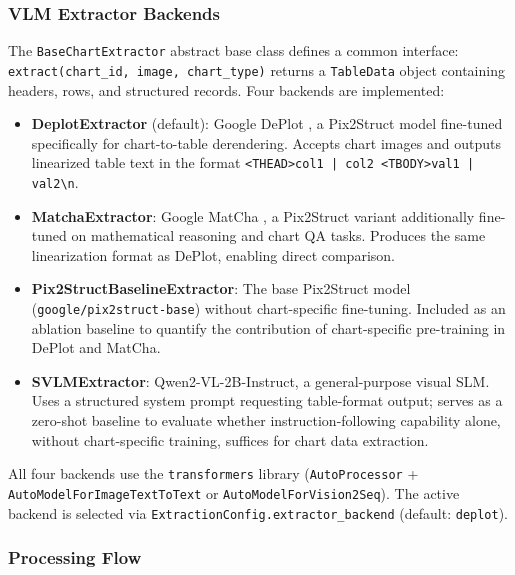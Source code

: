 \subsubsection{VLM Extractor Backends}

The \texttt{BaseChartExtractor} abstract base class defines a common interface:
\texttt{extract(chart\_id, image, chart\_type)} returns a \texttt{TableData} object
containing headers, rows, and structured records. Four backends are implemented:

\begin{itemize}
    \item \textbf{DeplotExtractor} (default): Google DePlot \cite{liu2023deplot},
          a Pix2Struct \cite{lee2023pix2struct} model fine-tuned specifically for
          chart-to-table derendering. Accepts chart images and outputs linearized table
          text in the format
          \texttt{<THEAD>col1 | col2 <TBODY>val1 | val2\textbackslash n}.

    \item \textbf{MatchaExtractor}: Google MatCha \cite{lee2023matcha}, a Pix2Struct
          variant additionally fine-tuned on mathematical reasoning and chart QA tasks.
          Produces the same linearization format as DePlot, enabling direct comparison.

    \item \textbf{Pix2StructBaselineExtractor}: The base Pix2Struct model
          (\texttt{google/pix2struct-base}) without chart-specific fine-tuning.
          Included as an ablation baseline to quantify the contribution of chart-specific
          pre-training in DePlot and MatCha.

    \item \textbf{SVLMExtractor}: Qwen2-VL-2B-Instruct, a general-purpose visual SLM.
          Uses a structured system prompt requesting table-format output; serves as a
          zero-shot baseline to evaluate whether instruction-following capability alone,
          without chart-specific training, suffices for chart data extraction.
\end{itemize}

All four backends use the \texttt{transformers} library
(\texttt{AutoProcessor} + \texttt{AutoModelForImageTextToText} or
\texttt{AutoModelForVision2Seq}). The active backend is selected via
\texttt{ExtractionConfig.extractor\_backend} (default: \texttt{deplot}).

\subsubsection{Processing Flow}

